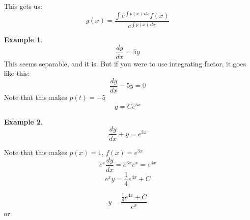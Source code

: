 \documentclass[10pt, oneside]{article}
\theoremstyle{definition}
\newtheorem{example}{Example}[section]
\begin{document}
This gets us:
\[y(x) = \frac{\int{e^{\int{p(x) \, dx}} f(x)}}{e^{\int{p(x) \, dx}}}\]

\begin{example}
    \[\frac{dy}{dx} = 5y\]
This seems separable, and it is. But if you were to use integrating factor, it goes like this:
\[
    \frac{dy}{dx} - 5y = 0
\]
Note that this makes $p(t) = -5$
\[
y = Ce^{5x}
\]
\end{example}

\begin{example}
    \[\frac{dy}{dx} + y = e^{3x}\]

Note that this makes $p(x) = 1$, $f(x) = e^{3x}$
\[
e^{x}\frac{dy}{dx} = e^{3x}e^x = e^{4x}
\]
\[
e^{x}y = \frac{1}{4}e^{4x} + C
\]

\[
y = \frac{\frac{1}{4}e^{4x} + C}{e^{x}}
\]
or:
\end{example}
\end{document}
